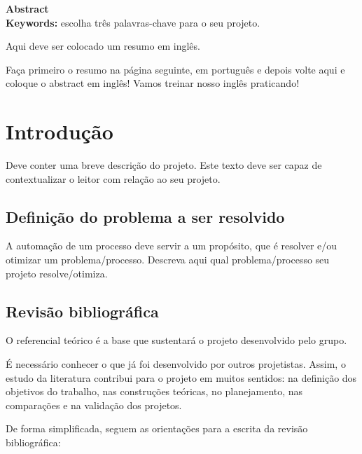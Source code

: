 \documentclass[10pt]{article}
\begin{document}
\newpage
\textbf{\Huge Abstract} 
\\
\linebreak
\textbf{Keywords:} escolha três palavras-chave para o seu projeto.

Aqui deve ser colocado um resumo em inglês.

Faça primeiro o resumo na página seguinte, em português e depois volte aqui e coloque o abstract em inglês! Vamos treinar nosso inglês praticando!

\newpage																
\tableofcontents  

\newpage
\section{Introdução}

Deve conter uma breve descrição do projeto.
Este texto deve ser capaz de contextualizar o leitor com relação ao seu projeto.

\subsection{Definição do problema a ser resolvido}

A automação de um processo deve servir a um propósito, que é resolver e/ou otimizar um problema/processo. Descreva aqui qual problema/processo seu projeto resolve/otimiza.

\subsection{Revisão bibliográfica}

O referencial teórico é a base que sustentará o projeto desenvolvido pelo grupo. 

É necessário conhecer o que já foi desenvolvido por outros projetistas. Assim, o estudo da literatura contribui para o projeto em muitos sentidos: na definição dos objetivos do trabalho, nas construções teóricas, no planejamento, nas comparações e na validação dos projetos.

De forma simplificada, seguem as orientações para a escrita da revisão bibliográfica:
\end{document}
